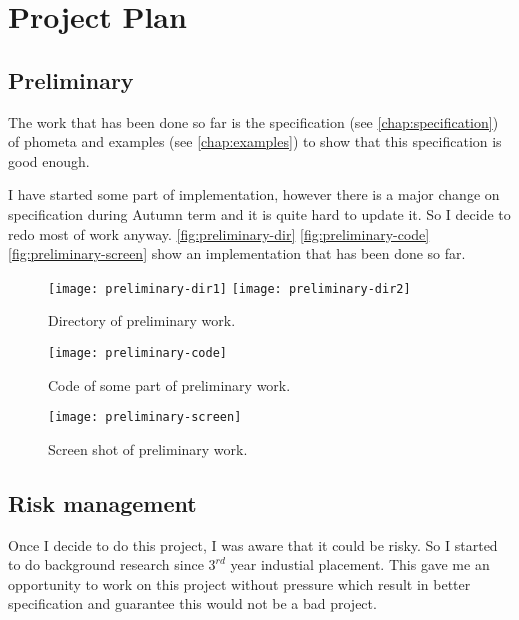 
\chapter{Project Plan}

\section{Preliminary}

The work that has been done so far is the specification (see \autoref{chap:specification}) of phometa and examples (see \autoref{chap:examples}) to show that this specification is good enough.

I have started some part of implementation, however there is a major change on specification during Autumn term and it is quite hard to update it. So I decide to redo most of work anyway. \autoref{fig:preliminary-dir} \autoref{fig:preliminary-code} \autoref{fig:preliminary-screen} show an implementation that has been done so far.

\begin{figure}[H]
    \centering
    \texttt{[image: preliminary-dir1]}
    \hspace{1cm}
    \texttt{[image: preliminary-dir2]}
    \caption{Directory of preliminary work.}
\label{fig:preliminary-dir}
\end{figure}

\begin{figure}[H]
    \centering
    \texttt{[image: preliminary-code]}
    \caption{Code of some part of preliminary work.}
\label{fig:preliminary-code}
\end{figure}

\begin{figure}[H]
    \centering
    \texttt{[image: preliminary-screen]}
    \caption{Screen shot of preliminary work.}
\label{fig:preliminary-screen}
\end{figure}

\section{Risk management}
Once I decide to do this project, I was aware that it could be risky. So I started to do background research since $3^{rd}$ year industial placement. This gave me an opportunity to work on this project without pressure which result in better specification and guarantee this would not be a bad project.


